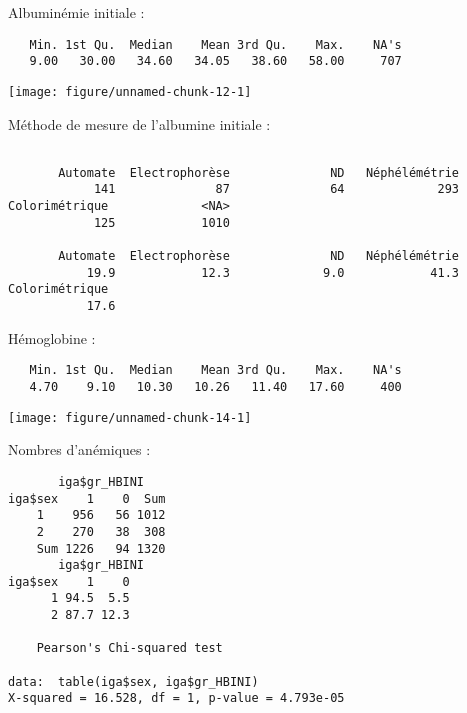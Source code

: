 \documentclass[11pt,a4paper]{article}\usepackage[]{graphicx}\usepackage[]{color}
\makeatletter
\def\maxwidth{ %
  \ifdim\Gin@nat@width>\linewidth
    \linewidth
  \else
    \Gin@nat@width
  \fi
}
\newenvironment{kframe}{%
 \def\at@end@of@kframe{}%
 \ifinner\ifhmode%
  \def\at@end@of@kframe{\end{minipage}}%
  \begin{minipage}{\columnwidth}%
 \fi\fi%
 \def\FrameCommand##1{\hskip\@totalleftmargin \hskip-\fboxsep
 \colorbox{shadecolor}{##1}\hskip-\fboxsep
     \hskip-\linewidth \hskip-\@totalleftmargin \hskip\columnwidth}%
 \MakeFramed {\advance\hsize-\width
   \@totalleftmargin\z@ \linewidth\hsize
   \@setminipage}}%
 {\par\unskip\endMakeFramed%
 \at@end@of@kframe}
\newenvironment{knitrout}{}{} %
\makeatother
\begin{document}
Albuminémie initiale :

\begin{knitrout}
\color{fgcolor}\begin{kframe}
\begin{verbatim}
   Min. 1st Qu.  Median    Mean 3rd Qu.    Max.    NA's 
   9.00   30.00   34.60   34.05   38.60   58.00     707 
\end{verbatim}
\end{kframe}
\texttt{[image: figure/unnamed-chunk-12-1]} 

\end{knitrout}

Méthode de mesure de l'albumine initiale :

\begin{knitrout}
\color{fgcolor}\begin{kframe}
\begin{verbatim}

       Automate  Electrophorèse              ND   Néphélémétrie 
            141              87              64             293 
Colorimétrique             <NA> 
            125            1010 

       Automate  Electrophorèse              ND   Néphélémétrie 
           19.9            12.3             9.0            41.3 
Colorimétrique  
           17.6 
\end{verbatim}
\end{kframe}
\end{knitrout}

Hémoglobine :

\begin{knitrout}
\color{fgcolor}\begin{kframe}
\begin{verbatim}
   Min. 1st Qu.  Median    Mean 3rd Qu.    Max.    NA's 
   4.70    9.10   10.30   10.26   11.40   17.60     400 
\end{verbatim}
\end{kframe}
\texttt{[image: figure/unnamed-chunk-14-1]} 

\end{knitrout}

Nombres d'anémiques :

\begin{knitrout}
\color{fgcolor}\begin{kframe}
\begin{verbatim}
       iga$gr_HBINI
iga$sex    1    0  Sum
    1    956   56 1012
    2    270   38  308
    Sum 1226   94 1320
       iga$gr_HBINI
iga$sex    1    0
      1 94.5  5.5
      2 87.7 12.3

	Pearson's Chi-squared test

data:  table(iga$sex, iga$gr_HBINI)
X-squared = 16.528, df = 1, p-value = 4.793e-05
\end{verbatim}
\end{kframe}
\end{knitrout}
\end{document}
